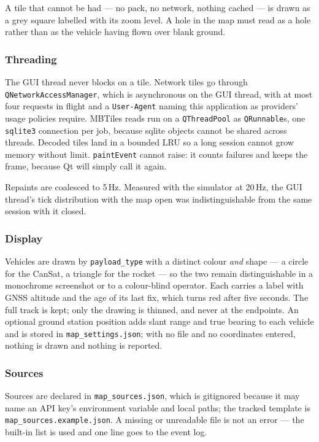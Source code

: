 \documentclass[11pt,a4paper]{article}
\begin{document}
A tile that cannot be had --- no pack, no network, nothing cached --- is
drawn as a grey square labelled with its zoom level. A hole in the map must
read as a hole rather than as the vehicle having flown over blank ground.

\subsubsection{Threading}

The GUI thread never blocks on a tile. Network tiles go through
\texttt{QNetworkAccessManager}, which is asynchronous on the GUI thread, with
at most four requests in flight and a \texttt{User-Agent} naming this
application as providers' usage policies require. MBTiles reads run on a
\texttt{QThreadPool} as \texttt{QRunnable}s, one \texttt{sqlite3} connection
per job, because sqlite objects cannot be shared across threads. Decoded
tiles land in a bounded LRU so a long session cannot grow memory without
limit. \texttt{paintEvent} cannot raise: it counts failures and keeps the
frame, because Qt will simply call it again.

Repaints are coalesced to 5\,Hz. Measured with the simulator at 20\,Hz, the
GUI thread's tick distribution with the map open was indistinguishable from
the same session with it closed.

\subsubsection{Display}

Vehicles are drawn by \texttt{payload\_type} with a distinct colour
\emph{and} shape --- a circle for the CanSat, a triangle for the rocket ---
so the two remain distinguishable in a monochrome screenshot or to a
colour-blind operator. Each carries a label with GNSS altitude and the age of
its last fix, which turns red after five seconds. The full track is kept;
only the drawing is thinned, and never at the endpoints. An optional ground
station position adds slant range and true bearing to each vehicle and is
stored in \texttt{map\_settings.json}; with no file and no coordinates
entered, nothing is drawn and nothing is reported.

\subsubsection{Sources}

Sources are declared in \texttt{map\_sources.json}, which is gitignored
because it may name an API key's environment variable and local paths; the
tracked template is \texttt{map\_sources.example.json}. A missing or
unreadable file is not an error --- the built-in list is used and one line
goes to the event log.
\end{document}

